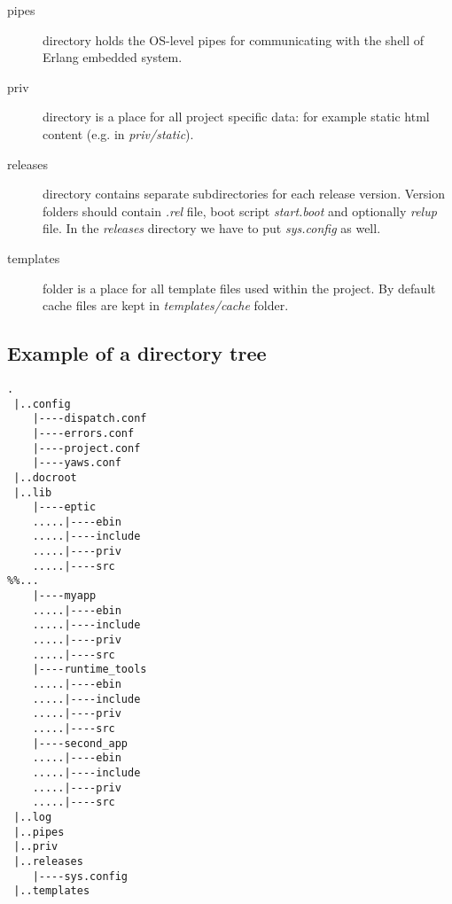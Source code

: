 \begin{description}
\item[pipes] directory holds the OS-level pipes for communicating with the shell of Erlang embedded system.

\item[priv] directory is a place for all project specific data: for example static html content (e.g. in {\it priv/static}).

\item[releases] directory contains separate subdirectories for each release version. Version folders should contain {\it .rel} file, boot script {\it start.boot} and optionally {\it relup} file. In the {\it releases} directory we have to put {\it sys.config} as well.

\item[templates] folder is a place for all template files used within the project. By default cache files are kept in {\it templates/cache} folder.
\end{description}

\clearpage
\subsection{Example of a directory tree}
\begin{verbatim}
.
 |..config
    |----dispatch.conf
    |----errors.conf
    |----project.conf
    |----yaws.conf
 |..docroot
 |..lib
    |----eptic
    .....|----ebin
    .....|----include
    .....|----priv
    .....|----src
%%...
    |----myapp
    .....|----ebin
    .....|----include
    .....|----priv
    .....|----src
    |----runtime_tools
    .....|----ebin
    .....|----include
    .....|----priv
    .....|----src
    |----second_app
    .....|----ebin
    .....|----include
    .....|----priv
    .....|----src
 |..log
 |..pipes
 |..priv
 |..releases
    |----sys.config
 |..templates
\end{verbatim}
